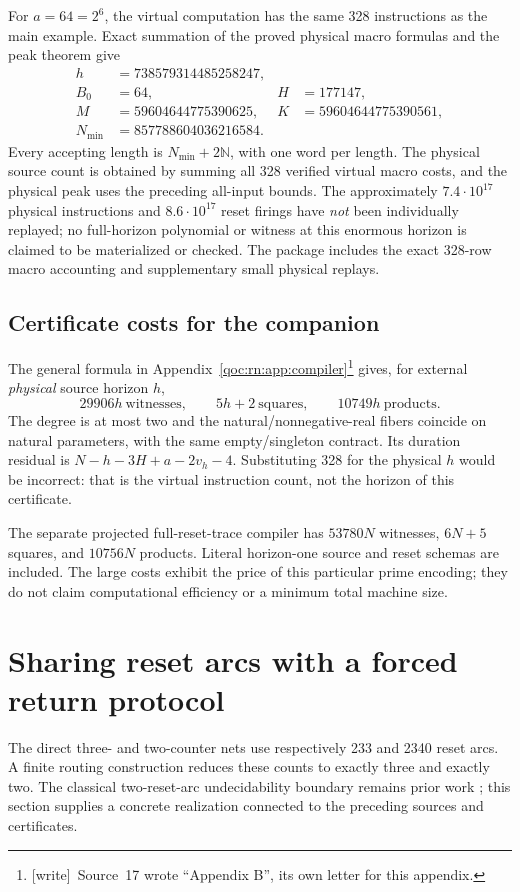 \documentclass[11pt,letterpaper]{article}
\theoremstyle{definition}
\theoremstyle{remark}
\newcommand{\N}{\mathbb N}
\newcommand{\wtag}{\textup{[write]}}
\begin{document}
For $a=64=2^6$, the virtual computation has the same 328 instructions as the main example. Exact summation of the proved physical macro formulas and the peak theorem give
\begin{align*}
 h&=738579314485258247,\\
 B_0&=64,& H&=177147,\\
 M&=59604644775390625,& K&=59604644775390561,\\
 N_{\min}&=857788604036216584.
\end{align*}
Every accepting length is $N_{\min}+2\N$, with one word per length. The physical source count is obtained by summing all 328 verified virtual macro costs, and the physical peak uses the preceding all-input bounds. The approximately $7.4\cdot10^{17}$ physical instructions and $8.6\cdot10^{17}$ reset firings have \emph{not} been individually replayed; no full-horizon polynomial or witness at this enormous horizon is claimed to be materialized or checked. The package includes the exact 328-row macro accounting and supplementary small physical replays.

\subsection{Certificate costs for the companion}
The general formula in Appendix~\ref{qoc:rn:app:compiler}\footnote{\wtag\ Source~17 wrote ``Appendix B'', its own letter for this appendix.} gives, for external \emph{physical} source horizon $h$,
\[
 29906h\ \text{witnesses},\qquad5h+2\ \text{squares},\qquad10749h\ \text{products}.
\]
The degree is at most two and the natural/nonnegative-real fibers coincide on natural parameters, with the same empty/singleton contract. Its duration residual is $N-h-3H+a-2v_h-4$. Substituting 328 for the physical $h$ would be incorrect: that is the virtual instruction count, not the horizon of this certificate.

The separate projected full-reset-trace compiler has $53780N$ witnesses, $6N+5$ squares, and $10756N$ products. Literal horizon-one source and reset schemas are included. The large costs exhibit the price of this particular prime encoding; they do not claim computational efficiency or a minimum total machine size.

\section{Sharing reset arcs with a forced return protocol}
\label{qoc:rn:sec:shared}
The direct three- and two-counter nets use respectively 233 and 2340 reset arcs. A finite routing construction reduces these counts to exactly three and exactly two. The classical two-reset-arc undecidability boundary remains prior work \cite[Section 5.2]{rn:akshay}; this section supplies a concrete realization connected to the preceding sources and certificates.
\end{document}

